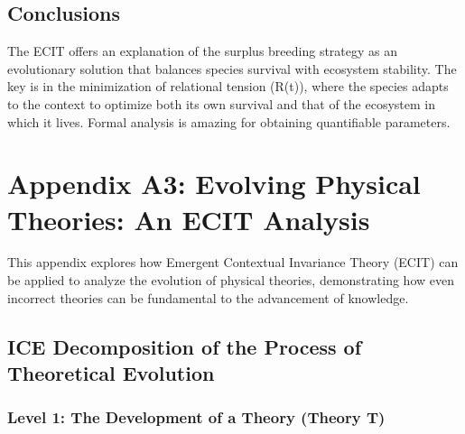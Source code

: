 \documentclass{article}
\begin{document}
\subsection{Conclusions}

The ECIT offers an explanation of the surplus breeding strategy as an evolutionary solution that balances species survival with ecosystem stability. The key is in the minimization of relational tension (R(t)), where the species adapts to the context to optimize both its own survival and that of the ecosystem in which it lives. Formal analysis is amazing for obtaining quantifiable parameters.




\newpage
\maketitle
\section{Appendix A3: Evolving Physical Theories: An ECIT Analysis}

This appendix explores how Emergent Contextual Invariance Theory (ECIT) can be applied to analyze the evolution of physical theories, demonstrating how even incorrect theories can be fundamental to the advancement of knowledge.

\subsection{ICE Decomposition of the Process of Theoretical Evolution}

\subsubsection{Level 1: The Development of a Theory (Theory T)}\par
\end{document}
